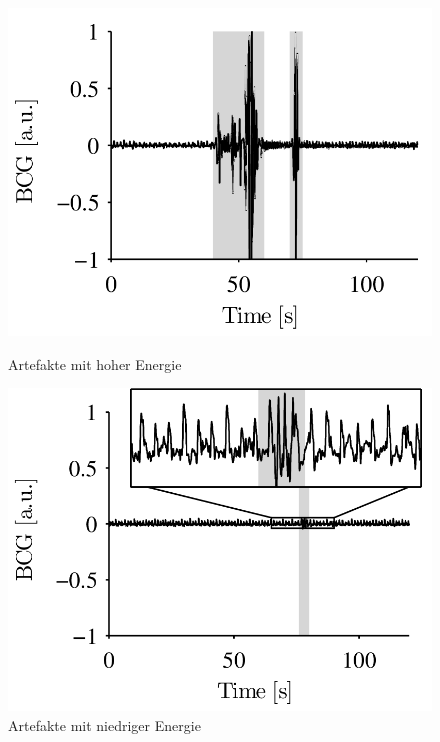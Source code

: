 	\begin{figure}[H]
		\centering
		\begin{minipage}{0.45\linewidth}
      		\includegraphics[width=\textwidth]{pic/high-energy-artifacts.png}
			\caption[Artefakte mit hoher Energie]{Artefakte mit hoher Energie}
			\label{fig:high-energy-artifact}
    	\end{minipage}
    	\hfill
    	\begin{minipage}{0.45\linewidth}
      		\includegraphics[width=\textwidth]{pic/low-energy-artifacts.png}
			\caption[Artefakte mit niedriger Energie]{Artefakte mit niedriger Energie}
			\label{fig:low-energy-artifact}
    \end{minipage}
		
	\end{figure}
	
